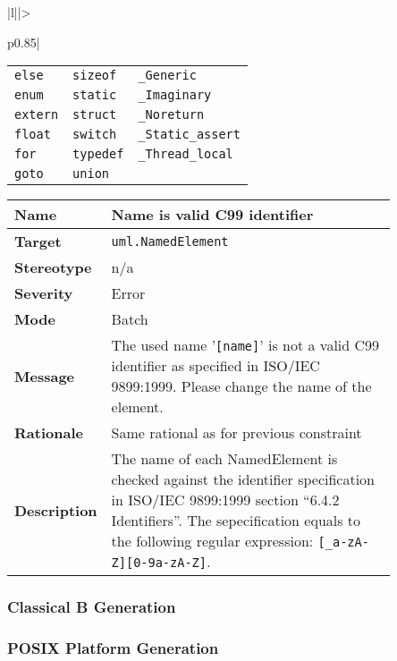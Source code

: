 \documentclass{template/openetcs_article}
\begin{document}
\begin{longtable}{|l||>{\raggedright}p{0.85\linewidth}|}
\begin{tabular}{l l l}
                           \texttt{else}     & \texttt{sizeof}   & \texttt{\_Generic}       \\
                           \texttt{enum}     & \texttt{static}   & \texttt{\_Imaginary}     \\
                           \texttt{extern}   & \texttt{struct}   & \texttt{\_Noreturn}      \\
                           \texttt{float}    & \texttt{switch}   & \texttt{\_Static\_assert} \\
                           \texttt{for}      & \texttt{typedef}  & \texttt{\_Thread\_local}  \\
                           \texttt{goto}     & \texttt{union} \\
                         \end{tabular}\tabularnewline \hline
\end{longtable}

\begin{longtable}{|l||>{\raggedright}p{0.85\linewidth}|}
  \hline
  \textbf{Name}        &  Name is valid C99 identifier \tabularnewline \hline
  \textbf{Target}      &  \texttt{uml.NamedElement} \tabularnewline \hline
  \textbf{Stereotype}  &  n/a \tabularnewline \hline
  \textbf{Severity}    &  Error \tabularnewline \hline
  \textbf{Mode}        &  Batch \tabularnewline \hline
  \textbf{Message}     &  The used name '\texttt{[name]}' is not a valid C99 identifier as specified in 
                          ISO/IEC 9899:1999. Please change the name of the element. \tabularnewline \hline
  \textbf{Rationale}   &  Same rational as for previous constraint \tabularnewline \hline
  \textbf{Description} &  The name of each NamedElement is checked against the identifier specification
                          in ISO/IEC 9899:1999 section ``6.4.2 Identifiers''. The sepecification equals to the
                          following regular expression: \texttt{[\_a-zA-Z][0-9a-zA-Z\*]}. \tabularnewline \hline
\end{longtable}


\subsubsection{Classical B Generation}

\subsubsection{POSIX Platform Generation}


% 
% 

\end{document}
